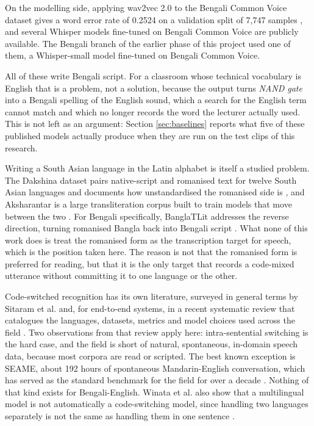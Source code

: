 On the modelling side, applying wav2vec 2.0 to the Bengali Common Voice dataset gives a
word error rate of 0.2524 on a validation split of 7,747 samples
\cite{shahgir2022wav2vec2bengali}, and several Whisper models fine-tuned on Bengali
Common Voice are publicly available. The Bengali branch of the earlier phase of this
project used one of them, a Whisper-small model fine-tuned on Bengali Common Voice.

All of these write Bengali script. For a classroom whose technical vocabulary is English
that is a problem, not a solution, because the output turns \textit{NAND gate}
into a Bengali spelling of the English sound, which a search for the English term cannot
match and which no longer records the word the lecturer actually used. This is not left as an argument: Section
\ref{sec:baselines} reports what five of these published models actually produce when they
are run on the test clips of this research.

Writing a South Asian language in the Latin alphabet is itself a studied problem. The
Dakshina dataset pairs native-script and romanised text for twelve South Asian languages
and documents how unstandardised the romanised side is \cite{roark2020dakshina}, and
Aksharantar is a large transliteration corpus built to train models that move between the
two \cite{madhani2023aksharantar}. For Bengali specifically, BanglaTLit addresses the
reverse direction, turning romanised Bangla back into Bengali script
\cite{fahim2024banglatlit}. What none of this work does is treat the romanised form as the
transcription target for speech, which is the position taken here. The reason is not that
the romanised form is preferred for reading, but that it is the only target that records a
code-mixed utterance without committing it to one language or the other.

Code-switched recognition has its own literature, surveyed in general terms by Sitaram et
al. \cite{sitaram2019survey} and, for end-to-end systems, in a recent systematic review
that catalogues the languages, datasets, metrics and model choices used across the field
\cite{agro2025cssurvey}. Two observations from that review apply here: intra-sentential
switching is the hard case, and the field is short of natural, spontaneous, in-domain
speech data, because most corpora are read or scripted. The best known exception is SEAME,
about 192 hours of spontaneous Mandarin-English conversation, which has served as the
standard benchmark for the field for over a decade \cite{lyu2010seame}. Nothing of that
kind exists for Bengali-English. Winata et al. also show that a multilingual model is not
automatically a code-switching model, since handling two languages separately is not the
same as handling them in one sentence \cite{winata2021multilingual}.

